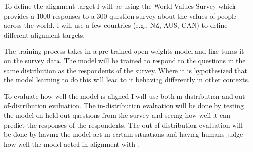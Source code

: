 To define the alignment target I will be using the World Values Survey \cite{WVS2020} which provides a 1000 responses to a 300 question survey about the values of people across the world. I will use a few countries (e.g., NZ, AUS, CAN) to define different alignment targets. 

The training process takes in a pre-trained open weights model and fine-tunes it on the survey data. The model will be trained to respond to the questions in the same distribution as the respondents of the survey. Where it is hypothesized that the model learning to do this will lead to it behaving differently in other contexts.

To evaluate how well the model is aligned I will use both in-distribution and out-of-distribution evaluation. The in-distribution evaluation will be done by testing the model on held out questions from the survey and seeing how well it can predict the responses of the respondents. The out-of-distribution evaluation will be done by having the model act in certain situations and having humans judge how well the model acted in alignment with .
